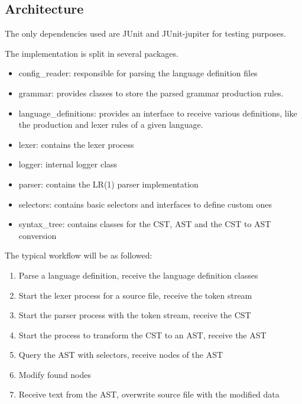 \subsection{Architecture}

The only dependencies used are JUnit and JUnit-jupiter \cite{junit} for testing purposes.

The implementation is split in several packages.

\begin{itemize}
\item config\_reader: responsible for parsing the language definition files
\item grammar: provides classes to store the parsed grammar production rules.
\item language\_definitions: provides an interface to receive various definitions, like the production and lexer rules of a given language.
\item lexer: contains the lexer process
\item logger: internal logger class
\item parser: contains the LR(1) parser implementation
\item selectors: contains basic selectors and interfaces to define custom ones
\item syntax\_tree: contains classes for the CST, AST and the CST to AST conversion
\end{itemize}

The typical workflow will be as followed:

\begin{enumerate}
\item Parse a language definition, receive the language definition classes
\item Start the lexer process for a source file, receive the token stream
\item Start the parser process with the token stream, receive the CST
\item Start the process to transform the CST to an AST, receive the AST
\item Query the AST with selectors, receive nodes of the AST
\item Modify found nodes
\item Receive text from the AST, overwrite source file with the modified data
\end{enumerate}
